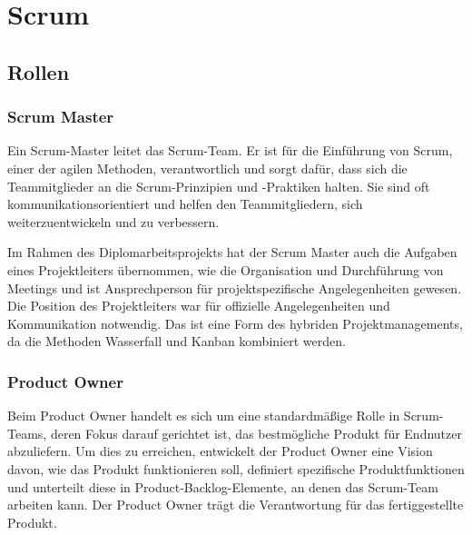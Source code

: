 
\section{Scrum}\label{sec:scrum}

\renewcommand{\kapitelautor}{Autor: Nils Hubmann}

\subsection{Rollen}\label{subsec:rollen}

%
\subsubsection{Scrum Master}\label{subsubsec:Scrum-Master}
%

\begin{coolQuote}
Ein Scrum-Master leitet das Scrum-Team.
Er ist für die Einführung von Scrum, einer der agilen Methoden, verantwortlich und sorgt dafür, dass sich die Teammitglieder an die Scrum-Prinzipien und -Praktiken halten.
Sie sind oft kommunikationsorientiert und helfen den Teammitgliedern, sich weiterzuentwickeln und zu verbessern.
\end{coolQuote}

Im Rahmen des Diplomarbeitsprojekts hat der Scrum Master auch die Aufgaben eines Projektleiters übernommen, wie die Organisation und Durchführung von Meetings und ist Ansprechperson für projektspezifische Angelegenheiten gewesen.
Die Position des Projektleiters war für offizielle Angelegenheiten und Kommunikation notwendig.
Das ist eine Form des hybriden Projektmanagements, da die Methoden Wasserfall und Kanban kombiniert werden.

%
\subsubsection{Product Owner}\label{subsubsec:Product-Owner}
%

\begin{coolQuote}
Beim Product Owner handelt es sich um eine standardmäßige Rolle in Scrum-Teams, deren Fokus darauf gerichtet ist, das bestmögliche Produkt für Endnutzer abzuliefern.
Um dies zu erreichen, entwickelt der Product Owner eine Vision davon, wie das Produkt funktionieren soll, definiert spezifische Produktfunktionen und unterteilt diese in Product-Backlog-Elemente, an denen das Scrum-Team arbeiten kann.
Der Product Owner trägt die Verantwortung für das fertiggestellte Produkt.
\end{coolQuote}

